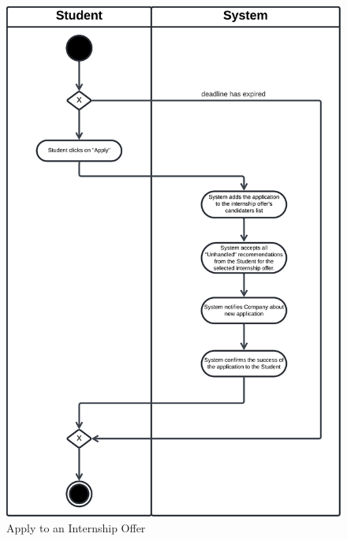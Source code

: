 \begin{figure}[H]
    \begin{center}
         \includegraphics[width=0.9\linewidth]{LaTeXCode/images/activity diagram/UC9.png}
         \caption{Apply to an Internship Offer}
         \label{fig:apply_to_internships_ad}
     \end{center}
\end{figure}

\newpage

